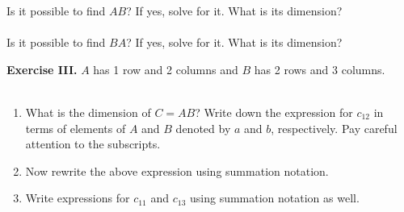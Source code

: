 \documentclass{./../../latex/handout}
\begin{document}
Is it possible to find $AB$? If yes, solve for it. What is its dimension? \\~\\
Is it possible to find $BA$? If yes, solve for it. What is its dimension?

\newpage
\textbf{Exercise III.} $A$ has 1 row and 2 columns and $B$  has 2 rows and 3 columns. \\~\\
\begin{enumerate}
\item What is the dimension of $C=AB$? Write down the expression for $c_{12}$ in terms of elements of $A$ and $B$ denoted by $a$ and $b$, respectively. Pay careful attention to the subscripts.
\vspace{7em}
\item Now rewrite the above expression using summation notation. 
\vspace{7em}
\item Write expressions for $c_{11}$ and $c_{13}$ using summation notation as well.
\end{enumerate}
\end{document}

